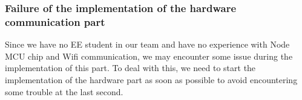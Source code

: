 \subsubsection{Failure of the implementation of the hardware communication part}
\noindent Since we have no EE student in our team and have no experience with Node MCU chip and Wifi communication, we may encounter some issue during the implementation of this part. To deal with this, we need to start the implementation of the hardware part as soon as possible to avoid encountering some trouble at the last second.